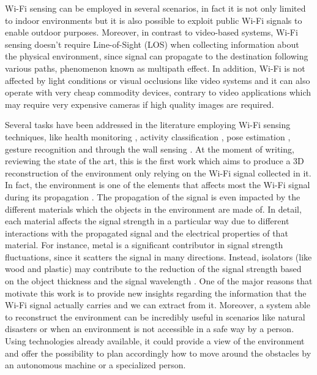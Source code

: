 \documentclass[binding=0.6cm,noexaminfo]{sapthesis}
\begin{document}
Wi-Fi sensing can be employed in several scenarios, in fact it is not only limited to indoor environments but it is also possible to exploit public Wi-Fi signals to enable outdoor purposes. Moreover, in contrast to video-based systems, Wi-Fi sensing doesn't require Line-of-Sight (LOS) when collecting information about the physical environment, since signal can propagate to the destination following various paths, phenomenon known as multipath effect. In addition, Wi-Fi is not affected by light conditions or visual occlusions like video systems and it can also operate with very cheap commodity devices, contrary to video applications which may require very expensive cameras if high quality images are required.

Several tasks have been addressed in the literature employing Wi-Fi sensing techniques, like health monitoring \cite{wifall}, activity classification \cite{human-to-human}, pose estimation \cite{person-in-wifi, towards-human-pose-construction, wimose}, gesture recognition \cite{novel-gesture-recognition} and through the wall sensing \cite{through-wall-sensing, violating-privacy}. At the moment of writing, reviewing the state of the art, this is the first work which aims to produce a 3D reconstruction of the environment only relying on the Wi-Fi signal collected in it.
In fact, the environment is one of the elements that affects most the Wi-Fi signal during its propagation \cite{effects-housing-environments, carm}. The propagation of the signal is even impacted by the different materials which the objects in the environment are made of. In detail, each material affects the signal strength in a particular way due to different interactions with the propagated signal and the electrical properties of that material. For instance, metal is a significant contributor in signal strength fluctuations, since it scatters the signal in many directions. Instead, isolators (like wood and plastic) may contribute to the reduction of the signal strength based on the object thickness and the signal wavelength \cite{study-materials-on-wifi}.
One of the major reasons that motivate this work is to provide new insights regarding the information that the Wi-Fi signal actually carries and we can extract from it. Moreover, a system able to reconstruct the environment can be incredibly useful in scenarios like natural disasters or when an environment is not accessible in a safe way by a person. Using technologies already available, it could provide a view of the environment and offer the possibility to plan accordingly how to move around the obstacles by an autonomous machine or a specialized person.
\end{document}

